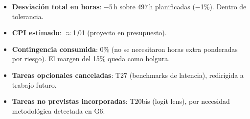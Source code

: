 \begin{itemize}[nosep, leftmargin=1.2em]
    \item \textbf{Desviación total en horas}: $-$5\,h sobre 497\,h
    planificadas ($-$1\%). Dentro de tolerancia.
    \item \textbf{CPI estimado}: $\approx$1{,}01 (proyecto en
    presupuesto).
    \item \textbf{Contingencia consumida}: 0\% (no se necesitaron
    horas extra ponderadas por riesgo). El margen del 15\% queda como
    holgura.
    \item \textbf{Tareas opcionales canceladas}: T27 (benchmarks de
    latencia), redirigida a trabajo futuro.
    \item \textbf{Tareas no previstas incorporadas}: T20bis (logit
    lens), por necesidad metodológica detectada en G6.
\end{itemize}
